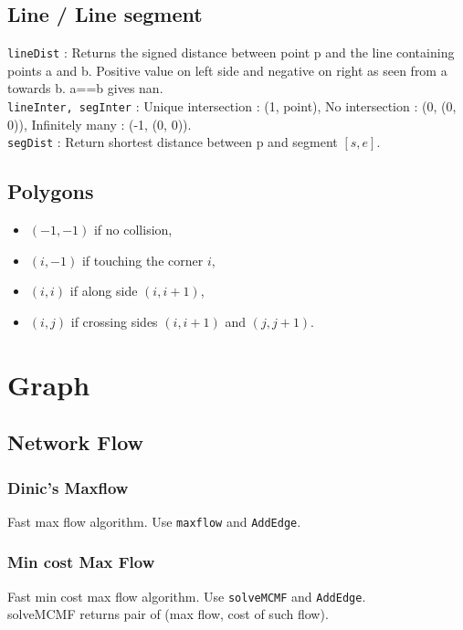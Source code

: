 \documentclass[landscape]{article}
\begin{document}
\begin{multicols}{2}
    \subsection{Line / Line segment}
        \texttt{lineDist} : Returns the signed distance between point p and the line containing points a and b. Positive value on left side and negative on right as seen from a towards b. a==b gives nan.\\
        \texttt{lineInter, segInter} : Unique intersection : (1, point), No intersection : (0, (0, 0)), Infinitely many : (-1, (0, 0)).\\
        \texttt{segDist} : Return shortest distance between p and segment $[s, e]$.
        

    \subsection{Polygons}
        
            \begin{itemize}
                \item $(-1, -1)$ if no collision,
                \item $(i, -1)$ if touching the corner $i$,
                \item $(i, i)$ if along side $(i, i+1)$,
                \item $(i, j)$ if crossing sides $(i, i+1)$ and $(j, j+1)$.
            \end{itemize}
        
\section{Graph}
    \subsection{Network Flow}
        \subsubsection{Dinic's Maxflow}
            Fast max flow algorithm. Use \texttt{maxflow} and \texttt{AddEdge}.
            
        \subsubsection{Min cost Max Flow}
            Fast min cost max flow algorithm. Use \texttt{solveMCMF} and \texttt{AddEdge}.\\
            solveMCMF returns pair of (max flow, cost of such flow).
            
    \eject{}
\end{multicols}
\end{document}
